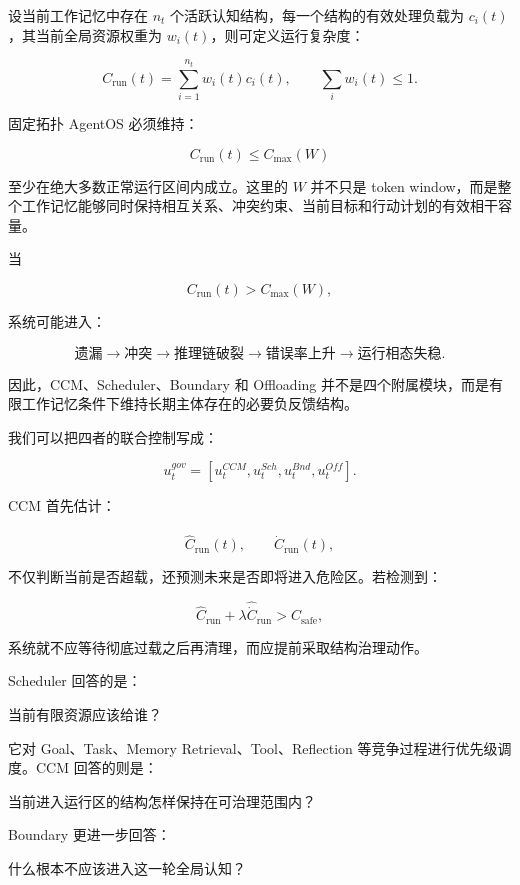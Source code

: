 设当前工作记忆中存在 $n_t$ 个活跃认知结构，每一个结构的有效处理负载为 $c_i(t)$，其当前全局资源权重为 $w_i(t)$，则可定义运行复杂度：

\[
C_{\mathrm{run}}(t)
=
\sum_{i=1}^{n_t}
w_i(t)c_i(t),
\qquad
\sum_iw_i(t)\leq 1.
\]

固定拓扑 AgentOS 必须维持：

\[
\boxed{
C_{\mathrm{run}}(t)
\leq
C_{\max}(W)
}
\]

至少在绝大多数正常运行区间内成立。这里的 $W$ 并不只是 token window，而是整个工作记忆能够同时保持相互关系、冲突约束、当前目标和行动计划的有效相干容量。

当

\[
C_{\mathrm{run}}(t)
>
C_{\max}(W),
\]

系统可能进入：

\[
\text{遗漏}
\rightarrow
\text{冲突}
\rightarrow
\text{推理链破裂}
\rightarrow
\text{错误率上升}
\rightarrow
\text{运行相态失稳}.
\]

因此，CCM、Scheduler、Boundary 和 Offloading 并不是四个附属模块，而是有限工作记忆条件下维持长期主体存在的必要负反馈结构。

我们可以把四者的联合控制写成：

\[
u^{gov}_t
=
\left[
u^{CCM}_t,
u^{Sch}_t,
u^{Bnd}_t,
u^{Off}_t
\right].
\]

CCM 首先估计：

\[
\hat{C}_{\mathrm{run}}(t),
\qquad
\widehat{\dot C}_{\mathrm{run}}(t),
\]

不仅判断当前是否超载，还预测未来是否即将进入危险区。若检测到：

\[
\hat C_{\mathrm{run}}
+
\lambda
\widehat{\dot C}_{\mathrm{run}}
>
C_{\mathrm{safe}},
\]

系统就不应等待彻底过载之后再清理，而应提前采取结构治理动作。

Scheduler 回答的是：

\begin{statementbox}
当前有限资源应该给谁？
\end{statementbox}

它对 Goal、Task、Memory Retrieval、Tool、Reflection 等竞争过程进行优先级调度。CCM 回答的则是：

\begin{statementbox}
当前进入运行区的结构怎样保持在可治理范围内？
\end{statementbox}

Boundary 更进一步回答：

\begin{statementbox}
什么根本不应该进入这一轮全局认知？
\end{statementbox}


